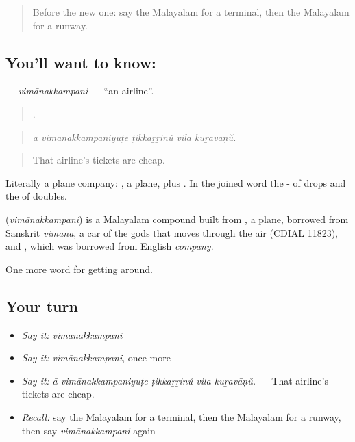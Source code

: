 \label{lesson:ML-C463-vimanakkampani}



\begin{quote}
Before the new one: say the Malayalam for a terminal, then the Malayalam for a runway.
\end{quote}

\subsection*{You'll want to know: }
\textbf{} — \emph{vimānakkampani} — \textquotedblleft{}an airline\textquotedblright{}.

\begin{quote}
    .
\end{quote}

\begin{quote}
\emph{ā vimānakkampaniyuṭe ṭikkaṟṟinŭ vila kuṟavāṇŭ.}
\end{quote}

\begin{quote}
That airline's tickets are cheap.
\end{quote}

Literally a plane company: , a plane, plus . In the joined word the - of  drops and the  of  doubles.

\begin{cousinweb}
\textbf{} (\emph{vimānakkampani}) is a Malayalam compound built from , a plane, borrowed from Sanskrit \emph{vimāna}, a car of the gods that moves through the air (CDIAL 11823), and , which was borrowed from English \emph{company}.
\end{cousinweb}

\begin{grammarlens}[title={What you've built}]
One more word for getting around.
\end{grammarlens}

\subsection*{Your turn}
\begin{itemize}
\raggedright
  \item \emph{Say it:} \emph{vimānakkampani}
  \item \emph{Say it:} \emph{vimānakkampani}, once more
  \item \emph{Say it:} \emph{ā vimānakkampaniyuṭe ṭikkaṟṟinŭ vila kuṟavāṇŭ.} — That airline's tickets are cheap.
  \item \emph{Recall:} say the Malayalam for a terminal, then the Malayalam for a runway, then say \emph{vimānakkampani} again
\end{itemize}

